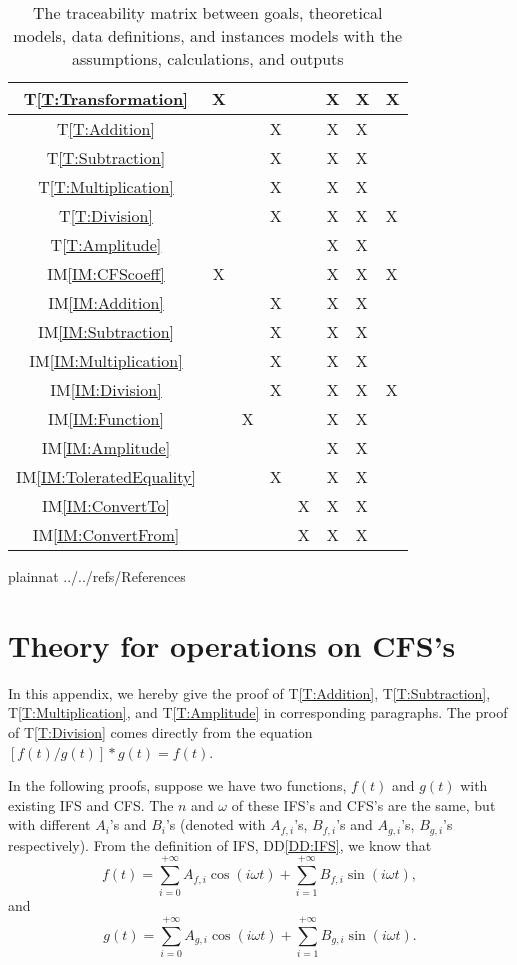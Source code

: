 \documentclass[12pt]{article}
\newcommand{\ddref}[1]{DD\ref{#1}}
\newcommand{\tref}[1]{T\ref{#1}}
\newcommand{\iref}[1]{IM\ref{#1}}
\begin{document}
\begin{table}
\begin{tabular}{|c|c|c|c|c|c|}
		\tref{T:Transformation}
		&X& & & &X&X&X\\\hline
		\tref{T:Addition}
		& & &X& &X&X& \\\hline
		\tref{T:Subtraction}
		& & &X& &X&X& \\\hline
		\tref{T:Multiplication}
		& & &X& &X&X& \\\hline
		\tref{T:Division}
		& & &X& &X&X&X\\\hline
		\tref{T:Amplitude}
		& & & & &X&X& \\\hline
		\iref{IM:CFScoeff}
		&X& & & &X&X&X\\\hline
		\iref{IM:Addition}
		& & &X& &X&X& \\\hline
		\iref{IM:Subtraction}
		& & &X& &X&X& \\\hline
		\iref{IM:Multiplication}
		& & &X& &X&X& \\\hline
		\iref{IM:Division}
		& & &X& &X&X&X\\\hline
		\iref{IM:Function}
		& &X& & &X&X& \\\hline
		\iref{IM:Amplitude}
		& & & & &X&X& \\\hline
		\iref{IM:ToleratedEquality}
		& & &X& &X&X& \\\hline
		\iref{IM:ConvertTo}
		& & & &X&X&X& \\\hline
		\iref{IM:ConvertFrom}
		& & & &X&X&X& \\\hline		
	\end{tabular}
	\caption{The traceability matrix between goals, 
		theoretical models, data definitions, and instances models 
		with the assumptions, calculations, and outputs}
	\label{Table:Traceability}
\end{table} 

\newpage

 {plainnat}
 {../../refs/References}

\newpage
\appendix

\section{Theory for operations on CFS's}\label{Appendix:Operations}
In this appendix, we hereby give the proof of 
\tref{T:Addition}, \tref{T:Subtraction}, \tref{T:Multiplication}, 
and \tref{T:Amplitude} in corresponding paragraphs. The proof of 
\tref{T:Division} comes directly from the equation 
$[f(t)/g(t)]*g(t)=f(t)$.

In the following proofs, suppose we have two functions, 
$f(t)$ and $g(t)$ with existing IFS and CFS. The $n$ and $\omega$ of 
these IFS's and CFS's are the same, but with different $A_i$'s and $B_i$'s 
(denoted with $A_{f, i}$'s, $B_{f, i}$'s and $A_{g,i}$'s, 
$B_{g,i}$'s respectively).
From the definition of IFS, \ddref{DD:IFS}, we know that 
\begin{equation}\label{Eq:fDef}
f(t)=\sum_{i=0}^{+\infty}A_{f, i}\cos(i\omega t)
+\sum_{i=1}^{+\infty}B_{f, i}\sin(i\omega t),
\end{equation} and \begin{equation}\label{Eq:gDef}
g(t)=\sum_{i=0}^{+\infty}A_{g, i}\cos(i\omega t)
+\sum_{i=1}^{+\infty}B_{g, i}\sin(i\omega t).
\end{equation}  
\end{document}
